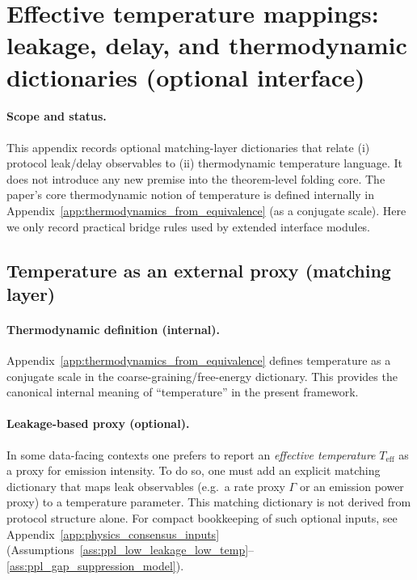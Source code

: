 \section{Effective temperature mappings: leakage, delay, and thermodynamic dictionaries (optional interface)}
\label{app:effective_temperature_mapping}

\paragraph{Scope and status.}
\AuditTag This appendix records optional matching-layer dictionaries that relate (i) protocol leak/delay observables to (ii) thermodynamic temperature language.
It does not introduce any new premise into the theorem-level folding core.
The paper's core thermodynamic notion of temperature is defined internally in Appendix~\ref{app:thermodynamics_from_equivalence} (as a conjugate scale).
Here we only record practical bridge rules used by extended interface modules.

\subsection{Temperature as an external proxy (matching layer)}
\label{subsec:teff_proxy}

\paragraph{Thermodynamic definition (internal).}
\InterfaceTag Appendix~\ref{app:thermodynamics_from_equivalence} defines temperature as a conjugate scale in the coarse-graining/free-energy dictionary.
This provides the canonical internal meaning of ``temperature'' in the present framework.

\paragraph{Leakage-based proxy (optional).}
\MatchTag In some data-facing contexts one prefers to report an \emph{effective temperature} $T_{\mathrm{eff}}$ as a proxy for emission intensity.
To do so, one must add an explicit matching dictionary that maps leak observables (e.g.\ a rate proxy $\Gamma$ or an emission power proxy) to a temperature parameter.
This matching dictionary is not derived from protocol structure alone.
For compact bookkeeping of such optional inputs, see Appendix~\ref{app:physics_consensus_inputs} (Assumptions~\ref{ass:ppl_low_leakage_low_temp}--\ref{ass:ppl_gap_suppression_model}).

